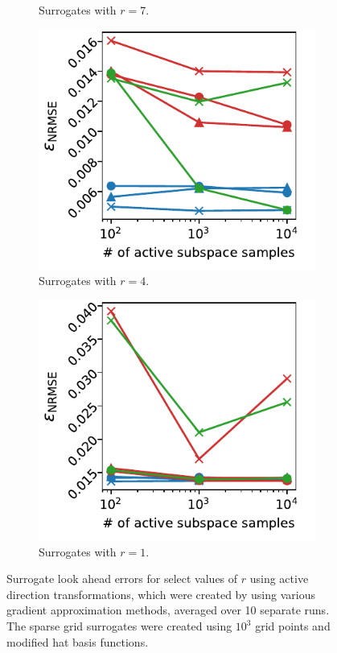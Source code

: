 \documentclass[
  a4paper,  %
  twoside,  %
  bibliography=totoc,
  headsepline,
  cleardoublepage=empty,
  parskip=half,
  draft=false
]{scrbook}
\begin{document}
\begin{mdframed}[style=style]
\begin{figure}[H]
\begin{subfigure}{.5\textwidth}
	\caption{Surrogates with $r=7$.}
	\label{fig:ww_as_3}
\end{subfigure}\vspace{4mm}
\begin{subfigure}{.5\textwidth}
  \centering
   \includegraphics[width=\linewidth]{graphics/ww_as_4}
	\caption{Surrogates with $r=4$.}
	\label{fig:ww_as_2}
\end{subfigure}
\begin{subfigure}{.5\textwidth}
  \centering
   \includegraphics[width=\linewidth]{graphics/ww_as_1}
	\caption{Surrogates with $r=1$.}
	\label{fig:ww_as_1}
\end{subfigure}\vspace{4mm}
\delimit
	\caption{Surrogate look ahead errors for select values of $r$ using active direction transformations, which were created by using various gradient approximation methods, averaged over 10 separate runs.
	The sparse grid surrogates were created using $10^3$ grid points and modified hat basis functions.}
	\label{fig:ww_as}
\end{figure}
\end{mdframed}
\end{document}
